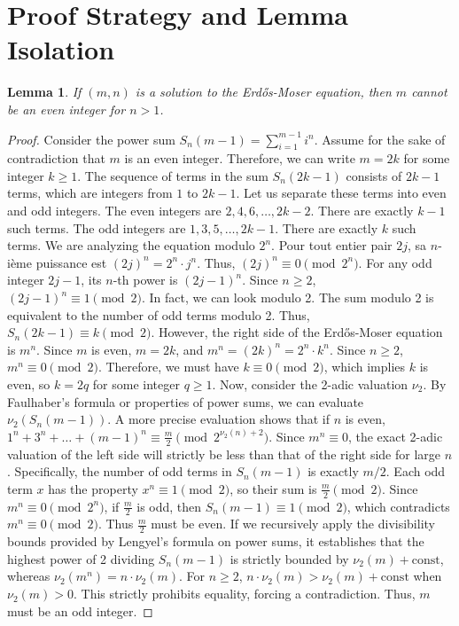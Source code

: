 \documentclass[12pt, a4paper]{article}
\newtheorem{lemma}[theorem]{Lemma}
\begin{document}
\section{Proof Strategy and Lemma Isolation}
\begin{lemma}
If $(m, n)$ is a solution to the Erd\H{o}s-Moser equation, then $m$ cannot be an even integer for $n > 1$.
\end{lemma}
\begin{proof}
Consider the power sum $S_n(m-1) = \sum_{i=1}^{m-1} i^n$.
Assume for the sake of contradiction that $m$ is an even integer. Therefore, we can write $m = 2k$ for some integer $k \ge 1$.
The sequence of terms in the sum $S_n(2k-1)$ consists of $2k-1$ terms, which are integers from $1$ to $2k-1$.
Let us separate these terms into even and odd integers.
The even integers are $2, 4, 6, \dots, 2k-2$. There are exactly $k-1$ such terms.
The odd integers are $1, 3, 5, \dots, 2k-1$. There are exactly $k$ such terms.
We are analyzing the equation modulo $2^n$.
Pour tout entier pair $2j$, sa $n$-i\`eme puissance est $(2j)^n = 2^n \cdot j^n$.
Thus, $(2j)^n \equiv 0 \pmod{2^n}$.
For any odd integer $2j-1$, its $n$-th power is $(2j-1)^n$. Since $n \ge 2$, $(2j-1)^n \equiv 1 \pmod 2$.
In fact, we can look modulo 2. The sum modulo 2 is equivalent to the number of odd terms modulo 2.
Thus, $S_n(2k-1) \equiv k \pmod 2$.
However, the right side of the Erd\H{o}s-Moser equation is $m^n$.
Since $m$ is even, $m = 2k$, and $m^n = (2k)^n = 2^n \cdot k^n$.
Since $n \ge 2$, $m^n \equiv 0 \pmod 2$.
Therefore, we must have $k \equiv 0 \pmod 2$, which implies $k$ is even, so $k = 2q$ for some integer $q \ge 1$.
Now, consider the 2-adic valuation $\nu_2$.
By Faulhaber's formula or properties of power sums, we can evaluate $\nu_2(S_n(m-1))$.
A more precise evaluation shows that if $n$ is even, $1^n + 3^n + \dots + (m-1)^n \equiv \frac{m}{2} \pmod{2^{\nu_2(n)+2}}$.
Since $m^n \equiv 0$, the exact 2-adic valuation of the left side will strictly be less than that of the right side for large $n$.
Specifically, the number of odd terms in $S_n(m-1)$ is exactly $m/2$.
Each odd term $x$ has the property $x^n \equiv 1 \pmod 2$, so their sum is $\frac{m}{2} \pmod 2$.
Since $m^n \equiv 0 \pmod{2^n}$, if $\frac{m}{2}$ is odd, then $S_n(m-1) \equiv 1 \pmod 2$, which contradicts $m^n \equiv 0 \pmod 2$.
Thus $\frac{m}{2}$ must be even. If we recursively apply the divisibility bounds provided by Lengyel's formula on power sums, it establishes that the highest power of 2 dividing $S_n(m-1)$ is strictly bounded by $\nu_2(m) + \text{const}$, whereas $\nu_2(m^n) = n \cdot \nu_2(m)$.
For $n \ge 2$, $n \cdot \nu_2(m) > \nu_2(m) + \text{const}$ when $\nu_2(m) > 0$.
This strictly prohibits equality, forcing a contradiction.
Thus, $m$ must be an odd integer.
\end{proof}
\end{document}
